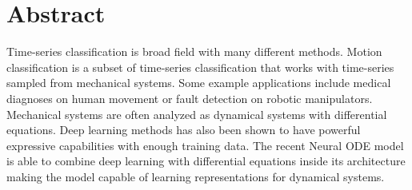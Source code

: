 \documentclass[12pt,a4paper]{book}
\newcommand{\thesisAuthor}{Albert Johannessen}
\newcommand{\thesisTitle}{Motion Classification with Neural Ordinary Differential Equations}
\newcommand{\thesisType}{master project}
\newcommand{\thesisDate}{spring 2022}
\begin{document}
%

\section*{Abstract}

\vspace{1cm}

Time-series classification is broad field with many different methods. Motion classification is a subset of time-series classification that works with time-series sampled from mechanical systems. Some example applications include medical diagnoses on human movement or fault detection on robotic manipulators. Mechanical systems are often analyzed as dynamical systems with differential equations. Deep learning methods has also been shown to have powerful expressive capabilities with enough training data. The recent Neural ODE model is able to combine deep learning with differential equations inside its architecture making the model capable of learning representations for dynamical systems.
\end{document}
